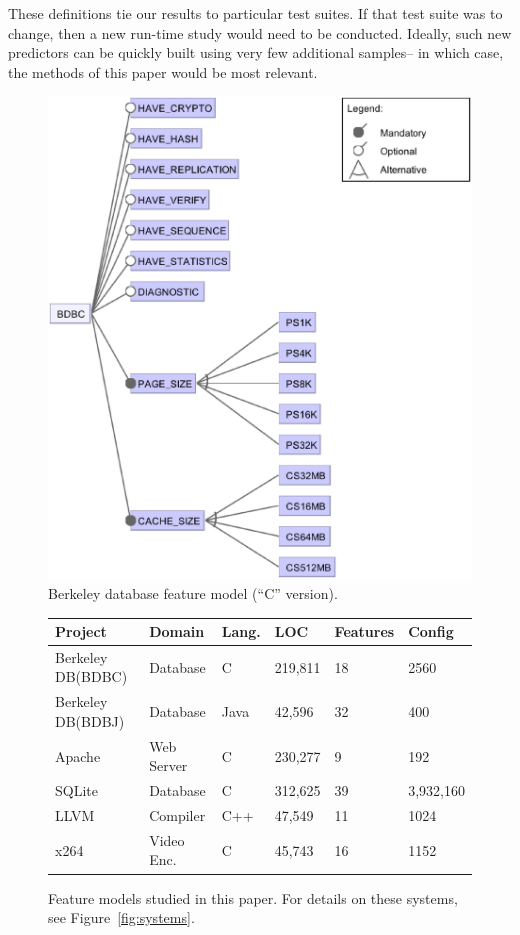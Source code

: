 \documentclass{sig-alternative}
\newcommand{\fig}[1]{Figure~\ref{fig:#1}}
\begin{document}
These definitions tie our results to particular test suites.
If that test suite was to change, then a  new
run-time study would need  to be conducted. Ideally, such new predictors
can be quickly built using very few additional samples-- in which case, the methods
of this paper would be most relevant.

 
\begin{figure}[!t]
\includegraphics[width=1\linewidth]{Figures/BDBC.eps}
\caption{ Berkeley database feature model   (``C'' version). }\label{fig:bdbc}
\end{figure}
    


\begin{figure}[!t]
\scriptsize
\begin{tabular}{llllll}
  \hline
Project & Domain & Lang. & LOC & Features & Config\\\hline
Berkeley DB(BDBC)   & Database & C & 219,811 & 18 & 2560\\
Berkeley DB(BDBJ)   & Database & Java & 42,596 & 32  & 400\\
Apache & Web Server & C & 230,277 & 9 & 192\\
SQLite & Database & C & 312,625 & 39 & 3,932,160\\
LLVM & Compiler & C++ & 47,549 & 11 & 1024\\
x264 & Video Enc. & C& 45,743 & 16 & 1152\\\hline
\end{tabular}
\caption{Feature models studied in this paper. For details on these systems,
see \fig{systems}.}
\label{fig:subjectsystems}
\end{figure}
\end{document}
